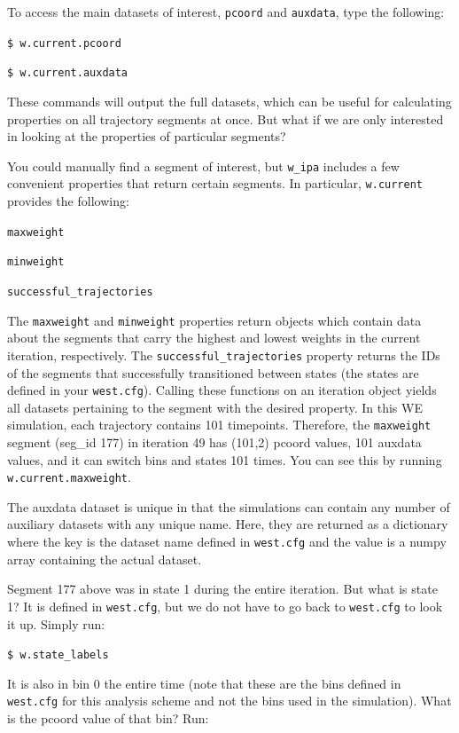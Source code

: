 \documentclass[9pt,tutorial,pubversion]{livecoms}
\begin{document}
To access the main datasets of interest, \verb|pcoord| and \verb|auxdata|, type the following: 

\verb|$ w.current.pcoord|

\verb|$ w.current.auxdata|

These commands will output the full datasets, which can be useful for calculating properties on all trajectory segments at once. 
But what if we are only interested in looking at the properties of particular segments?

You could manually find a segment of interest, but \verb|w_ipa| includes a few convenient properties that return certain segments. 
In particular, \verb|w.current| provides the following:

\verb|maxweight|

\verb|minweight|

\verb|successful_trajectories|

The \verb|maxweight| and \verb|minweight| properties return objects which contain data about the segments that carry the highest and lowest weights in the current iteration, respectively. 
The \verb|successful_trajectories| property returns the IDs of the segments that successfully transitioned between states  (the states are defined in your \verb|west.cfg|). 
Calling these functions on an iteration object yields all datasets pertaining to the segment with the desired property. 
In this WE simulation, each trajectory contains 101 timepoints. 
Therefore, the \verb|maxweight| segment (seg\_id 177) in iteration 49 has (101,2) pcoord values, 101 auxdata values, and it can switch bins and states 101 times. 
You can see this by running \verb|w.current.maxweight|.
 
The auxdata dataset is unique in that the simulations can contain any number of auxiliary datasets with any unique name. 
Here, they are returned as a dictionary where the key is the dataset name defined in \verb|west.cfg| and the value is a numpy array containing the actual dataset.

Segment 177 above was in state 1 during the entire iteration. 
But what is state 1? 
It is defined in \verb|west.cfg|, but we do not have to go back to \verb|west.cfg| to look it up. 
Simply run:

\verb|$ w.state_labels|

It is also in bin 0 the entire time (note that these are the bins defined in \verb|west.cfg| for this analysis scheme and not the bins used in the simulation). 
What is the pcoord value of that bin? Run:
\end{document}
